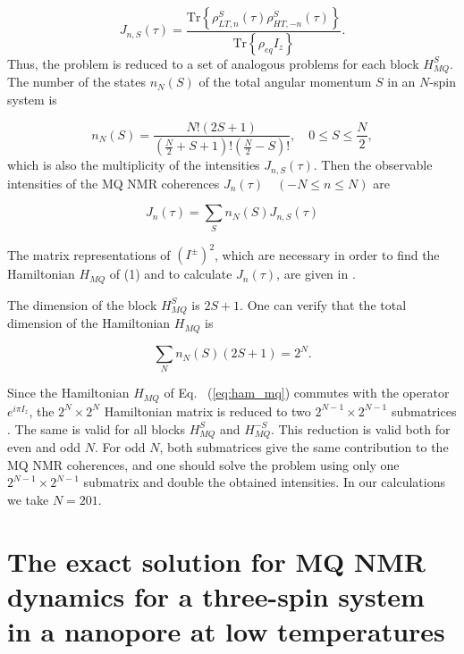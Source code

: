\documentclass[
    pra,  
    twocolumn, 
    floatfix, 
    amsmath, 
    amssymb, 
    superscriptaddress
]{revtex4-1}
\begin{document}
\begin{equation}
    \label{eq:coherence_k_s}
    J_{n, S}(\tau) = \dfrac{\mathrm{Tr}\left\{
        \rho_{LT, n}^S(\tau)\rho_{HT, -n}^S(\tau)
    \right\}}
    {\mathrm{Tr}\left\{\rho_{eq} I_z\right\}}.
\end{equation}
Thus, the problem is reduced to a set of analogous problems for each block $H_{MQ}^S$. The number of the states $n_N(S)$ of the total angular momentum $S$ in an $N$-spin system is \cite{Landau}

\begin{equation}
    \label{eq:coeff_n}
    n_N(S)  = \dfrac{ N! (2S+1)}
    {(\frac N 2 + S + 1)!(\frac N 2 - S)!}, 
    \quad
    0\leq S \leq \frac N 2, 
\end{equation}
which is also the multiplicity of the intensities $J_{n, S}(\tau)$. Then the observable intensities of the  MQ NMR coherences $J_n(\tau)\quad(-N\leq n \leq N)$ are 

\begin{equation}
    \label{eq:coherence_k}
    J_n(\tau) = \sum\limits_S n_N(S) J_{n, S}(\tau)
\end{equation}

The matrix representations of $(I^{\pm})^2$, which are necessary in order to find the Hamiltonian $H_{MQ}$ of (1) and to calculate $J_n(\tau)$, are given in \cite{lab:mq_nmr_dyn_in_nanopores_2009}. 

The dimension of the block $H_{MQ}^S$ is $2S+1$. One can verify \cite{lab:mq_nmr_dyn_in_nanopores_2009} that the total dimension of the Hamiltonian $H_{MQ}$ is 

\begin{equation}
    \sum\limits_N n_N(S)(2S+1) = 2^N.
\end{equation}

Since the Hamiltonian $H_{MQ}$ of Eq.   ~(\ref{eq:ham_mq}) commutes with the operator $e^{i\pi I_z}$, the $2^N\times2^N$ Hamiltonian matrix is reduced to two $2^{N-1}\times2^{N-1}$ submatrices \cite{lab:mq_nmr_dyn_in_nanopores_2009}. The same is valid for all blocks $H_{MQ}^S$ and $H_{MQ}^{-S}$. This reduction is valid both for even and odd $N$. For odd $N$, both submatrices give the same contribution to the MQ NMR coherences, and one should solve the problem using only one $2^{N-1}\times2^{N-1}$ submatrix and double the obtained intensities. In our calculations we take $N=201$.


\section{The exact solution for MQ NMR dynamics for a three-spin system in a nanopore at low temperatures}
\label{sec:exact_sol}
\end{document}
